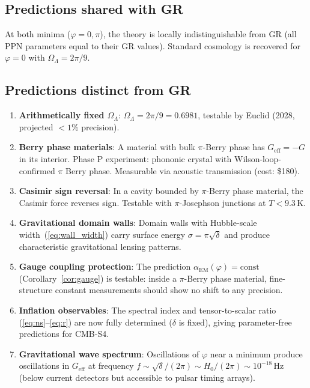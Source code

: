 \documentclass[aps,prd,twocolumn,superscriptaddress,nofootinbib]{revtex4-2}
\newcommand{\Geff}{G_{\mathrm{eff}}}
\begin{document}
\subsection{Predictions shared with GR}

At both minima ($\varphi = 0, \pi$), the theory
is locally indistinguishable from GR
(all PPN parameters equal to their GR values).
Standard cosmology is recovered for $\varphi = 0$
with $\Omega_\Lambda = 2\pi/9$.

\subsection{Predictions distinct from GR}

\begin{enumerate}
\item \textbf{Arithmetically fixed $\Omega_\Lambda$}:
  $\Omega_\Lambda = 2\pi/9 = 0.6981$,
  testable by Euclid (2028, projected $< 1\%$ precision).

\item \textbf{Berry phase materials}:
  A material with bulk $\pi$-Berry phase has
  $\Geff = -G$ in its interior.
  Phase P experiment: phononic crystal with
  Wilson-loop-confirmed $\pi$ Berry phase.
  Measurable via acoustic transmission (cost: \$180).

\item \textbf{Casimir sign reversal}:
  In a cavity bounded by $\pi$-Berry phase material,
  the Casimir force reverses sign.
  Testable with $\pi$-Josephson junctions at $T < 9.3\,$K.

\item \textbf{Gravitational domain walls}:
  Domain walls with Hubble-scale width~(\ref{eq:wall_width})
  carry surface energy $\sigma = \pi\sqrt{\delta}$
  and produce characteristic gravitational lensing patterns.

\item \textbf{Gauge coupling protection}:
  The prediction $\alpha_{\mathrm{EM}}(\varphi) = \mathrm{const}$
  (Corollary~\ref{cor:gauge}) is testable: inside a
  $\pi$-Berry phase material, fine-structure constant
  measurements should show no shift to any precision.

\item \textbf{Inflation observables}:
  The spectral index and tensor-to-scalar ratio
  (\ref{eq:ns}--\ref{eq:r}) are now fully determined
  ($\delta$ is fixed), giving parameter-free predictions
  for CMB-S4.

\item \textbf{Gravitational wave spectrum}:
  Oscillations of $\varphi$ near a minimum
  produce oscillations in $\Geff$ at frequency
  $f \sim \sqrt{\delta}/(2\pi) \sim H_0/(2\pi)
  \sim 10^{-18}\,$Hz
  (below current detectors but accessible to
  pulsar timing arrays).
\end{enumerate}
\end{document}
